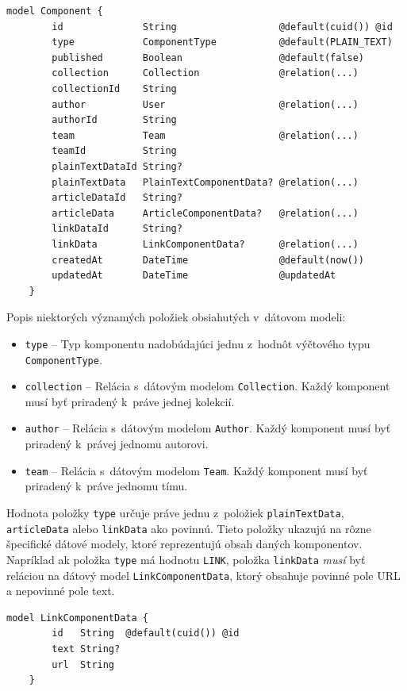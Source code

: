 \begin{lstlisting}[caption=Dátový model \texttt{Component} v~konfiguračnom súbore \texttt{prisma}.]
	model Component {
		id              String                  @default(cuid()) @id
		type            ComponentType           @default(PLAIN_TEXT)
		published       Boolean                 @default(false)
		collection      Collection              @relation(...)
		collectionId    String
		author          User                    @relation(...)
		authorId        String
		team            Team                    @relation(...)
		teamId          String
		plainTextDataId String?
		plainTextData   PlainTextComponentData? @relation(...)
		articleDataId   String?
		articleData     ArticleComponentData?   @relation(...)
		linkDataId      String?
		linkData        LinkComponentData?      @relation(...)
		createdAt       DateTime                @default(now())
		updatedAt       DateTime                @updatedAt
	}
\end{lstlisting}

\medskip

\noindent Popis niektorých významých položiek obsiahutých v~dátovom modeli:

\begin{itemize}
	\item \texttt{type} -- Typ komponentu nadobúdajúci jednu z~hodnôt výčtového typu \texttt{ComponentType}.
	\item \texttt{collection} -- Relácia s~dátovým modelom \texttt{Collection}. Každý komponent musí byť priradený k~práve jednej kolekcií.
	\item \texttt{author} -- Relácia s~dátovým modelom \texttt{Author}. Každý komponent musí byť priradený k~právej jednomu autorovi.
	\item \texttt{team} -- Relácia s~dátovým modelom \texttt{Team}. Každý komponent musí byť priradený k~práve jednomu tímu.
\end{itemize}

\noindent Hodnota položky \texttt{type} určuje práve jednu z~položiek \texttt{plainTextData}, \texttt{articleData} alebo \texttt{linkData} ako povinnú. Tieto položky ukazujú na rôzne špecifické dátové modely, ktoré reprezentujú obsah daných komponentov. Napríklad ak položka \texttt{type} má hodnotu \texttt{LINK}, položka \texttt{linkData} \emph{musí} byť reláciou na dátový model \texttt{LinkComponentData}, ktorý obsahuje povinné pole URL a nepovinné pole text. \\

\begin{lstlisting}[caption=Dátový model \texttt{LinkComponentData} v~konfiguračnom súbore \texttt{prisma}.]
	model LinkComponentData {
		id   String  @default(cuid()) @id
		text String?
		url  String
	}
\end{lstlisting}

